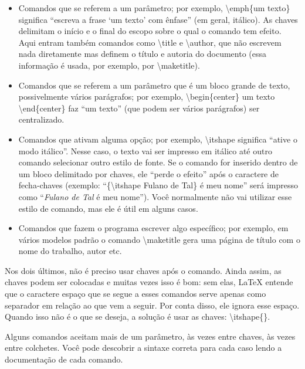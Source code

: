 \begin{itemize}
\item Comandos que se referem a um parâmetro; por exemplo,
\textsf{\textbackslash{}emph\{um texto\}} significa ``escreva a frase
`um texto' com ênfase'' (em geral, itálico). As chaves delimitam o início
e o final do escopo sobre o qual o comando tem efeito. Aqui entram também
comandos como \textsf{\textbackslash{}title} e \textsf{\textbackslash{}author},
que não escrevem nada diretamente mas definem o título e autoria do documento
(essa informação é usada, por exemplo, por \textsf{\textbackslash{}maketitle}).

\item Comandos que se referem a um parâmetro que é um bloco grande de
texto, possivelmente vários parágrafos; por exemplo,
\textsf{\textbackslash{}begin\{center\} um texto
\textbackslash{}end\{center\}} faz ``um texto'' (que podem ser
vários parágrafos) ser centralizado.

\item Comandos que ativam alguma opção; por exemplo,
\textsf{\textbackslash{}itshape} significa ``ative o modo itálico''.
Nesse caso, o texto vai ser impresso em itálico até outro comando selecionar
outro estilo de fonte. Se o comando for inserido dentro de um bloco
delimitado por chaves, ele ``perde o efeito'' após o caractere de fecha-chaves
(exemplo: ``\textsf{\{\textbackslash{}itshape Fulano de Tal\} é meu nome}''
será impresso como ``\textit{Fulano de Tal} é meu nome''). Você normalmente
não vai utilizar esse estilo de comando, mas ele é útil em alguns casos.

\item Comandos que fazem o programa escrever algo específico; por exemplo,
em vários modelos padrão o comando \textsf{\textbackslash{}maketitle} gera
uma página de título com o nome do trabalho, autor etc.
\end{itemize}

Nos dois últimos, não é preciso usar chaves após o comando. Ainda assim, as
chaves podem ser colocadas e muitas vezes isso é bom: sem elas, \LaTeX{}
entende que o caractere espaço que se segue a esses comandos serve apenas
como separador em relação ao que vem a seguir. Por conta disso, ele ignora
esse espaço. Quando isso não é o que se deseja, a solução é usar as chaves:
\textsf{\textbackslash{}itshape\{\}}.

Alguns comandos aceitam mais de um parâmetro, às vezes entre chaves, às
vezes entre colchetes. Você pode descobrir a sintaxe correta para cada caso
lendo a documentação de cada comando.

